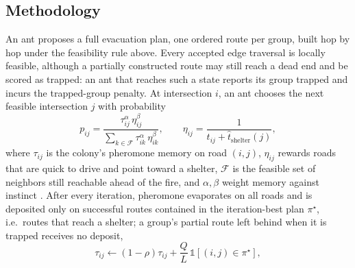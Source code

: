\documentclass{ai-lab-report}
\begin{document}
\subsection{Methodology}
An ant proposes a full evacuation plan, one ordered route per group, built hop by hop under the feasibility rule above. Every accepted edge traversal is locally feasible, although a partially constructed route may still reach a dead end and be scored as trapped: an ant that reaches such a state reports its group trapped and incurs the trapped-group penalty. At intersection $i$, an ant chooses the next feasible intersection $j$ with probability
\begin{equation}
p_{ij} = \frac{\tau_{ij}^{\alpha}\,\eta_{ij}^{\beta}}{\sum_{k\in\mathcal{F}}\tau_{ik}^{\alpha}\,\eta_{ik}^{\beta}}, \qquad \eta_{ij} = \frac{1}{t_{ij}+\hat t_{\text{shelter}}(j)},
\label{eq:a3-aco-prob}
\end{equation}
where $\tau_{ij}$ is the colony's pheromone memory on road $(i,j)$, $\eta_{ij}$ rewards roads that are quick to drive and point toward a shelter, $\mathcal{F}$ is the feasible set of neighbors still reachable ahead of the fire, and $\alpha,\beta$ weight memory against instinct \citep{dorigo1996antsystem}. After every iteration, pheromone evaporates on all roads and is deposited only on successful routes contained in the iteration-best plan $\pi^\star$, i.e.\ routes that reach a shelter; a group's partial route left behind when it is trapped receives no deposit,
\begin{equation}
\tau_{ij}\leftarrow(1-\rho)\tau_{ij} + \frac{Q}{L}\,\mathbb{1}[(i,j)\in\pi^\star],
\label{eq:a3-pheromone-update}
\end{equation}
\end{document}

